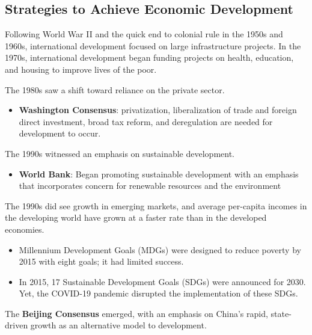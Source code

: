 \documentclass[
]{book}
\providecommand{\tightlist}{%
  \setlength{\itemsep}{0pt}\setlength{\parskip}{0pt}}
\begin{document}
\hypertarget{strategies-to-achieve-economic-development}{%
\subsection{Strategies to Achieve Economic Development}\label{strategies-to-achieve-economic-development}}

Following World War II and the quick end to colonial rule in the 1950s and 1960s, international development focused on large infrastructure projects. In the 1970s, international development began funding projects on health, education, and housing to improve lives of the poor.

The 1980s saw a shift toward reliance on the private sector.

\begin{itemize}
\tightlist
\item
  \textbf{Washington Consensus}: privatization, liberalization of trade and foreign direct investment, broad tax reform, and deregulation are needed for development to occur.
\end{itemize}

The 1990s witnessed an emphasis on sustainable development.

\begin{itemize}
\tightlist
\item
  \textbf{World Bank}: Began promoting sustainable development with an emphasis that incorporates concern for renewable resources and the environment
\end{itemize}

The 1990s did see growth in emerging markets, and average per-capita incomes in the developing world have grown at a faster rate than in the developed economies.

\begin{itemize}
\item
  Millennium Development Goals (MDGs) were designed to reduce poverty by 2015 with eight goals; it had limited success.
\item
  In 2015, 17 Sustainable Development Goals (SDGs) were announced for 2030. Yet, the COVID-19 pandemic disrupted the implementation of these SDGs.
\end{itemize}

The \textbf{Beijing Consensus} emerged, with an emphasis on China's rapid, state-driven growth as an alternative model to development.
\end{document}
